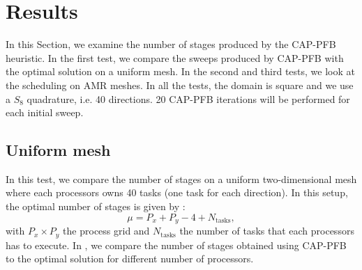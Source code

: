 \documentclass{mc2015}
\renewcommand{\(}{\left(}
\renewcommand{\)}{\right)}
\renewcommand{\[}{\left[}
\renewcommand{\]}{\right]}
\begin{document}
\section{Results} \label{results}

In this Section, we examine the number of stages produced by the CAP-PFB
heuristic. In the first test, we compare the sweeps produced by CAP-PFB
with the optimal solution on a uniform mesh. In the second and third tests, we
look at the scheduling on AMR meshes. In all the tests, the domain is square and
we use a $S_8$ quadrature, i.e. 40 directions. 20 CAP-PFB iterations will be
performed for each initial sweep.

\subsection{Uniform mesh}

In this test, we compare the number of stages on a uniform two-dimensional mesh 
where each processors owns 40 tasks (one task for each direction). In this
setup, the optimal number of stages is given by \cite{Adams2013}:
\begin{equation}
  \mu = P_x + P_y - 4 + N_{\textrm{tasks}},
\end{equation}
\noindent with $P_x \times P_y$ the process grid and $N_{\textrm{tasks}}$ the number of
tasks that each processors has to execute. In , we compare the number of
stages obtained using CAP-PFB to the optimal solution for different number of
processors.
\end{document}
